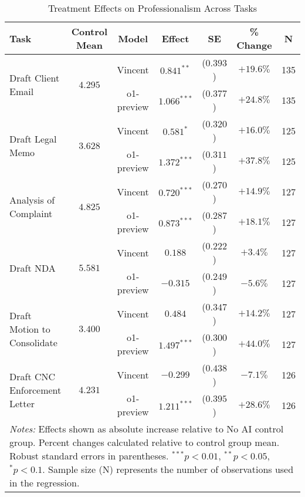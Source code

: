 \begin{table}[!htbp]
\centering
\caption{Treatment Effects on Professionalism Across Tasks}
\label{tab:professionalism_effects}
\begin{tabular}{lcccccc}
\hline\hline
Task & Control Mean & Model & Effect & SE & \% Change & N \\
\hline
\multirow{2}{*}{Draft Client Email} & \multirow{2}{*}{$4.295$} & Vincent & $0.841^{**}$ & ($0.393$) & $+19.6\%$ & 135 \\
& & o1-preview & $1.066^{***}$ & ($0.377$) & $+24.8\%$ & 135 \\
\hline
\multirow{2}{*}{Draft Legal Memo} & \multirow{2}{*}{$3.628$} & Vincent & $0.581^{*}$ & ($0.320$) & $+16.0\%$ & 125 \\
& & o1-preview & $1.372^{***}$ & ($0.311$) & $+37.8\%$ & 125 \\
\hline
\multirow{2}{*}{Analysis of Complaint} & \multirow{2}{*}{$4.825$} & Vincent & $0.720^{***}$ & ($0.270$) & $+14.9\%$ & 127 \\
& & o1-preview & $0.873^{***}$ & ($0.287$) & $+18.1\%$ & 127 \\
\hline
\multirow{2}{*}{Draft NDA} & \multirow{2}{*}{$5.581$} & Vincent & $0.188$ & ($0.222$) & $+3.4\%$ & 127 \\
& & o1-preview & $-0.315$ & ($0.249$) & $-5.6\%$ & 127 \\
\hline
\multirow{2}{*}{Draft Motion to Consolidate} & \multirow{2}{*}{$3.400$} & Vincent & $0.484$ & ($0.347$) & $+14.2\%$ & 127 \\
& & o1-preview & $1.497^{***}$ & ($0.300$) & $+44.0\%$ & 127 \\
\hline
\multirow{2}{*}{Draft CNC Enforcement Letter} & \multirow{2}{*}{$4.231$} & Vincent & $-0.299$ & ($0.438$) & $-7.1\%$ & 126 \\
& & o1-preview & $1.211^{***}$ & ($0.395$) & $+28.6\%$ & 126 \\
\hline
\multicolumn{7}{p{0.95\linewidth}}{\footnotesize \textit{Notes:} Effects shown as absolute increase relative to No AI control group. Percent changes calculated relative to control group mean. Robust standard errors in parentheses. $^{***}p<0.01$, $^{**}p<0.05$, $^{*}p<0.1$. Sample size (N) represents the number of observations used in the regression.}
\end{tabular}
\end{table}